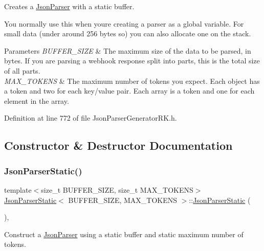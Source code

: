 Creates a \hyperlink{class_json_parser}{Json\+Parser} with a static buffer. 

You normally use this when you\textquotesingle{}re creating a parser as a global variable. For small data (under around 256 bytes so) you can also allocate one on the stack.


\begin{DoxyParams}{Parameters}
{\em B\+U\+F\+F\+E\+R\+\_\+\+S\+I\+ZE} & The maximum size of the data to be parsed, in bytes. If you are parsing a webhook response split into parts, this is the total size of all parts.\\
\hline
{\em M\+A\+X\+\_\+\+T\+O\+K\+E\+NS} & The maximum number of tokens you expect. Each object has a token and two for each key/value pair. Each array is a token and one for each element in the array. \\
\hline
\end{DoxyParams}


Definition at line 772 of file Json\+Parser\+Generator\+R\+K.\+h.



\subsection{Constructor \& Destructor Documentation}
\mbox{\label{class_json_parser_static_a6d0aa92ea003e383a1efa1a8533e1e60}} 
\subsubsection{\texorpdfstring{Json\+Parser\+Static()}{JsonParserStatic()}}
{\footnotesize\ttfamily template$<$size\+\_\+t B\+U\+F\+F\+E\+R\+\_\+\+S\+I\+ZE, size\+\_\+t M\+A\+X\+\_\+\+T\+O\+K\+E\+NS$>$ \\
\hyperlink{class_json_parser_static}{Json\+Parser\+Static}$<$ B\+U\+F\+F\+E\+R\+\_\+\+S\+I\+ZE, M\+A\+X\+\_\+\+T\+O\+K\+E\+NS $>$\+::\hyperlink{class_json_parser_static}{Json\+Parser\+Static} (\begin{DoxyParamCaption}{ }\end{DoxyParamCaption})\hspace{0.3cm}{\ttfamily [inline]}, {\ttfamily [explicit]}}



Construct a \hyperlink{class_json_parser}{Json\+Parser} using a static buffer and static maximum number of tokens. 



